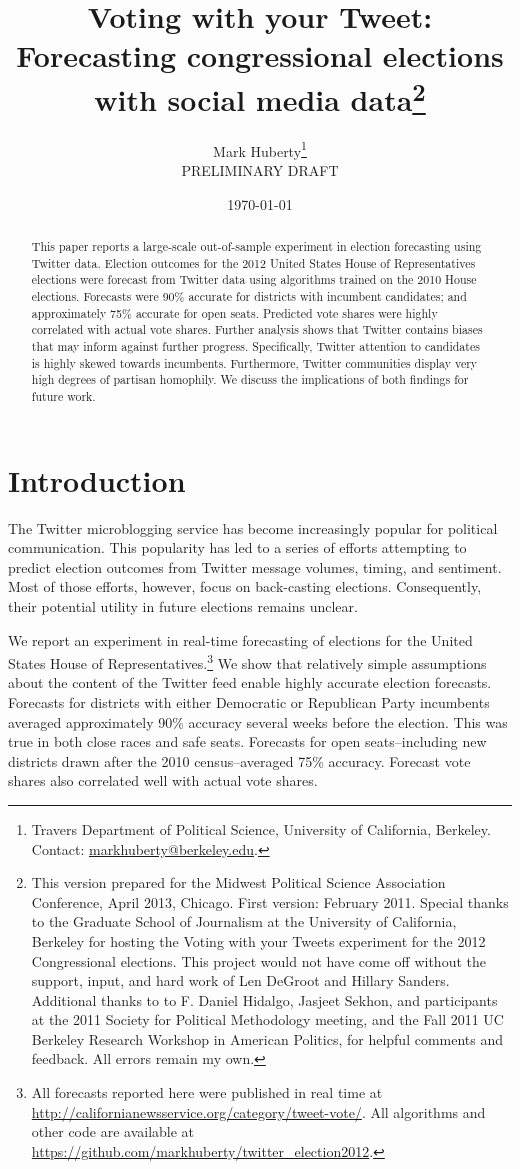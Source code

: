 \documentclass[11pt]{article}
\title{Voting with your Tweet:\\ Forecasting congressional elections
  with social media data\thanks{This version prepared for the Midwest
    Political Science Association Conference, April 2013, Chicago. First version: February 2011. Special
    thanks to the Graduate School of Journalism at the University of
    California, Berkeley for hosting the Voting with your Tweets
    experiment for the 2012 Congressional elections. This project
    would not have come off without the support, input, and hard work
    of Len DeGroot and Hillary Sanders. Additional thanks to
    to F. Daniel Hidalgo, Jasjeet
    Sekhon, and participants at the 2011 Society for Political
    Methodology meeting, and the Fall 2011 UC Berkeley Research Workshop in
    American Politics, for helpful comments and feedback. All errors remain my
    own.}}
\author{Mark Huberty\thanks{Travers Department of Political Science,
    University of California, Berkeley. Contact:
    \url{markhuberty@berkeley.edu}.}\\ PRELIMINARY DRAFT}
\date{\today}
\begin{document}
\maketitle
\doublespacing

\begin{abstract}
  This paper reports a large-scale out-of-sample experiment in
  election forecasting using Twitter data. Election outcomes for the
  2012 United States House of Representatives elections were forecast
  from Twitter data using algorithms trained on the 2010 House
  elections. Forecasts were 90\% accurate for districts with incumbent
  candidates; and approximately 75\% accurate for open
  seats. Predicted vote shares were highly correlated with actual vote
  shares. Further analysis shows that Twitter contains biases that may
  inform against further progress. Specifically, Twitter attention to
  candidates is highly skewed towards incumbents. Furthermore, Twitter
  communities display very high degrees of partisan homophily. We
  discuss the implications of both findings for future work.
\end{abstract}
\section{Introduction}
\label{sec:introduction}

The Twitter microblogging service has become increasingly popular for
political communication. This popularity has led to a series of
efforts attempting to predict election outcomes from Twitter message
volumes, timing, and sentiment. Most of those efforts, however, focus
on back-casting elections. Consequently, their potential utility in
future elections remains unclear. 

We report an experiment in real-time forecasting of elections for the
United States House of Representatives.\footnote{All forecasts
  reported here were published in real time at
  \url{http://californianewsservice.org/category/tweet-vote/}. All
  algorithms and other code are available at
  \url{https://github.com/markhuberty/twitter_election2012}.} We show
that relatively simple assumptions about the content of the Twitter
feed enable highly accurate election forecasts. Forecasts for
districts with either Democratic or Republican Party incumbents
averaged approximately 90\% accuracy several weeks before the
election. This was true in both close races and safe seats. Forecasts
for open seats--including new districts drawn after the 2010
census--averaged 75\% accuracy. Forecast vote shares also correlated
well with actual vote shares. 
\end{document}
